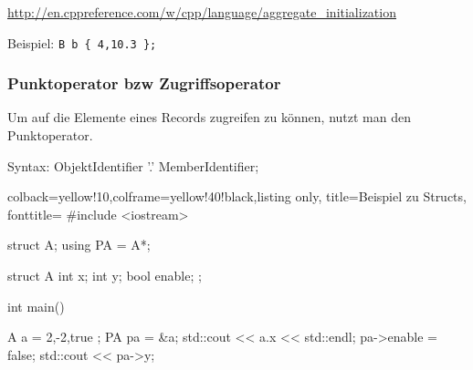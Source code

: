 \documentclass[a4paper]{report}
\begin{document}
\url{http://en.cppreference.com/w/cpp/language/aggregate_initialization}

Beispiel: \quad \texttt{B b \{ 4,10.3 \};}

\subsubsection{Punktoperator bzw Zugriffsoperator}

Um auf die Elemente eines Records zugreifen zu können, nutzt man den Punktoperator.

\begin{rail}
	Syntax:
	ObjektIdentifier '.' MemberIdentifier;
\end{rail}

\begin{tcblisting}{colback=yellow!10,colframe=yellow!40!black,listing only,
		title=Beispiel zu Structs, fonttitle=\bfseries}
	#include <iostream>
	
	struct A;
	using PA = A*;
	
	struct A {
		int x;
		int y;
		bool enable;
	};
	
	int main(){
	
	A a = { 2,-2,true };
	PA pa = &a;
	std::cout << a.x << std::endl;
	pa->enable = false;
	std::cout << pa->y;
	
	}
\end{tcblisting}

\end{document}
